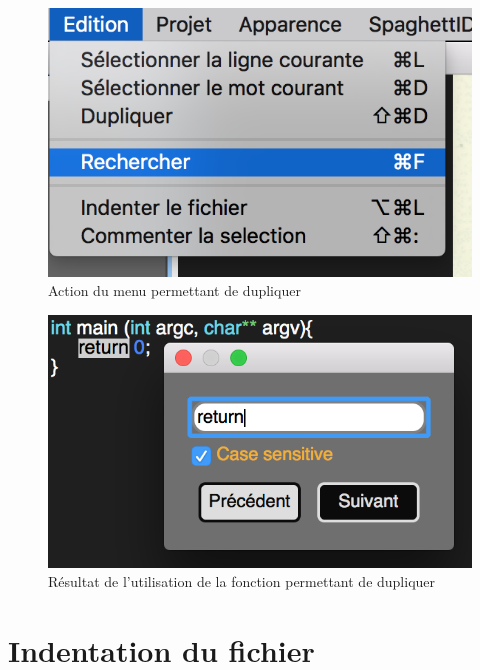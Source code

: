 \documentclass[a4paper,12pt]{article}
\begin{document}
	\begin{figure}[h!]
		\begin{center}
			\includegraphics[scale=0.8]{imgs/utilisation_rechercher}
			\caption{Action du menu permettant de dupliquer}
		\end{center}
	\end{figure}

	\begin{figure}[h!]
		\begin{center}
			\includegraphics[scale=0.8]{imgs/resultat_rechercher}
			\caption{Résultat de l'utilisation de la fonction permettant de dupliquer}
		\end{center}
	\end{figure}

\section{Indentation du fichier}
\end{document}
